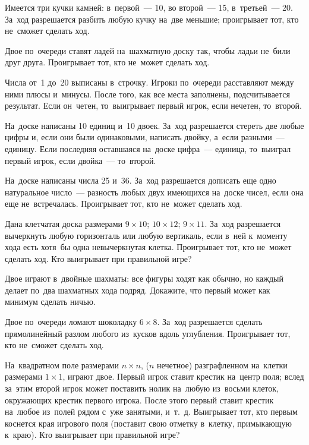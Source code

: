\begin{problems}

\item
Имеется три кучки камней: в~первой~--- 10, во второй~--- 15, в~третьей~--- 20.
За~ход разрешается разбить любую кучку на~две меньшие;
проигрывает тот, кто не~сможет сделать ход.

\item
Двое по~очереди ставят ладей на~шахматную доску так, чтобы ладьи не~били друг
друга.
Проигрывает тот, кто не~может сделать ход.

\item
Числа от~1 до~20 выписаны в~строчку.
Игроки по~очереди расставляют между ними плюсы и~минусы.
После того, как все места заполнены, подсчитывается результат.
Если он~четен, то~выигрывает первый игрок, если нечетен, то~второй.

\item
На~доске написаны 10 единиц и~10 двоек.
За~ход разрешается стереть две любые цифры и, если они были одинаковыми,
написать двойку, а~если разными~--- единицу.
Если последняя оставшаяся на~доске цифра~--- единица, то~выиграл первый игрок,
если двойка~--- то~второй.

\item
На~доске написаны числа 25 и~36.
За~ход разрешается дописать еще одно натуральное число~--- разность любых двух
имеющихся на~доске чисел, если она еще не~встречалась.
Проигрывает тот, кто не~может сделать ход.

\item
Дана клетчатая доска размерами
\quad
\sbp $9 \times 10$;
\quad
\sbp $10 \times 12$;
\quad
\sbp $9 \times 11$.
\quad
За~ход разрешается вычеркнуть любую горизонталь или любую вертикаль, если в~ней
к~моменту хода есть хотя~бы одна невычеркнутая клетка.
Проигрывает тот, кто не~может сделать ход.
Кто выигрывает при правильной игре?

\item
Двое играют в~двойные шахматы:
все фигуры ходят как обычно, но каждый делает по~два шахматных хода подряд.
Докажите, что первый может как минимум сделать ничью.

\item
Двое по~очереди ломают шоколадку $6 \times 8$.
За~ход разрешается сделать прямолинейный разлом любого из~кусков вдоль
углубления.
Проигрывает тот, кто не~сможет сделать ход.

\item
На~квадратном поле размерами $n \times n$, ($n$ нечетное) разграфленном
на~клетки размерами $1 \times 1$, играют двое.
Первый игрок ставит крестик на~центр поля;
вслед за~этим второй игрок может поставить нолик на~любую из~восьми клеток,
окружающих крестик первого игрока.
После этого первый ставит крестик на~любое из~полей рядом с~уже занятыми,
и~т.~д.
Выигрывает тот, кто первым коснется края игрового поля (поставит свою отметку
в~клетку, примыкающую к~краю).
Кто выигрывает при правильной игре?

\end{problems}

